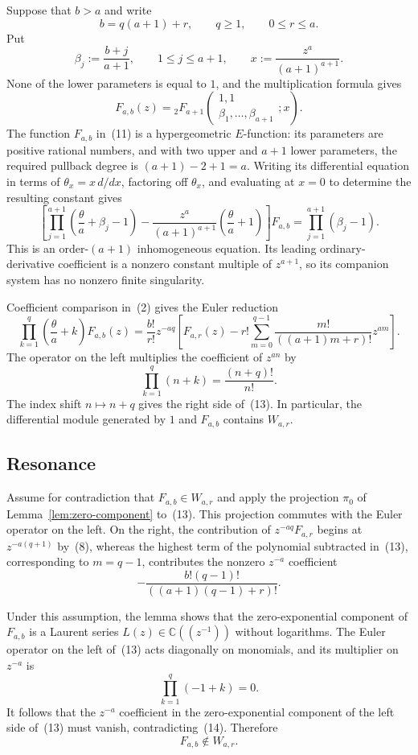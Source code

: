 \documentclass[12pt]{article}
\begin{document}
Suppose that $b>a$ and write
\[
b=q(a+1)+r,
\qquad q\geq1,
\qquad 0\leq r\leq a.
\tag{10}
\]
Put
\[
\beta_j:=\frac{b+j}{a+1},
\qquad 1\leq j\leq a+1,
\qquad
x:=\frac{z^a}{(a+1)^{a+1}}.
\]
None of the lower parameters is equal to $1$, and the multiplication formula gives
\[
F_{a,b}(z)
={}_2F_{a+1}\!\left(
\begin{matrix}1,1\\\beta_1,\ldots,\beta_{a+1}\end{matrix};
x
\right).
\tag{11}
\]
The function $F_{a,b}$ in~(11) is a hypergeometric $E$-function: its parameters are positive rational numbers, and with two upper and $a+1$ lower parameters, the required pullback degree is $(a+1)-2+1=a$. Writing its differential equation in terms of $\theta_x=x\,d/dx$, factoring off $\theta_x$, and evaluating at $x=0$ to determine the resulting constant gives
\[
\left[
\prod_{j=1}^{a+1}\left(\frac{\theta}{a}+\beta_j-1\right)
-\frac{z^a}{(a+1)^{a+1}}\left(\frac{\theta}{a}+1\right)
\right]F_{a,b}
=\prod_{j=1}^{a+1}(\beta_j-1).
\tag{12}
\]
This is an order-$(a+1)$ inhomogeneous equation. Its leading ordinary-derivative coefficient is a nonzero constant multiple of $z^{a+1}$, so its companion system has no nonzero finite singularity.

Coefficient comparison in~(2) gives the Euler reduction
\[
\boxed{
\prod_{k=1}^{q}\left(\frac{\theta}{a}+k\right)F_{a,b}(z)
=\frac{b!}{r!}z^{-aq}
\left[
F_{a,r}(z)
-r!\sum_{m=0}^{q-1}
\frac{m!}{((a+1)m+r)!}z^{am}
\right].}
\tag{13}
\]
The operator on the left multiplies the coefficient of $z^{an}$ by
\[
\prod_{k=1}^{q}(n+k)=\frac{(n+q)!}{n!}.
\]
The index shift $n\mapsto n+q$ gives the right side of~(13). In particular, the differential module generated by $1$ and $F_{a,b}$ contains $W_{a,r}$.

\subsection{Resonance}
\label{sec:resonance}

Assume for contradiction that $F_{a,b}\in W_{a,r}$ and apply the projection $\pi_0$ of Lemma~\ref{lem:zero-component} to~(13). This projection commutes with the Euler operator on the left. On the right, the contribution of $z^{-aq}F_{a,r}$ begins at $z^{-a(q+1)}$ by~(8), whereas the highest term of the polynomial subtracted in~(13), corresponding to $m=q-1$, contributes the nonzero $z^{-a}$ coefficient
\[
-\frac{b!(q-1)!}{((a+1)(q-1)+r)!}.
\tag{14}
\]

Under this assumption, the lemma shows that the zero-exponential component of $F_{a,b}$ is a Laurent series $L(z)\in\mathbb C((z^{-1}))$ without logarithms. The Euler operator on the left of~(13) acts diagonally on monomials, and its multiplier on $z^{-a}$ is
\[
\prod_{k=1}^{q}(-1+k)=0.
\tag{15}
\]
It follows that the $z^{-a}$ coefficient in the zero-exponential component of the left side of~(13) must vanish, contradicting~(14). Therefore
\[
F_{a,b}\notin W_{a,r}.
\tag{16}
\]
\end{document}
